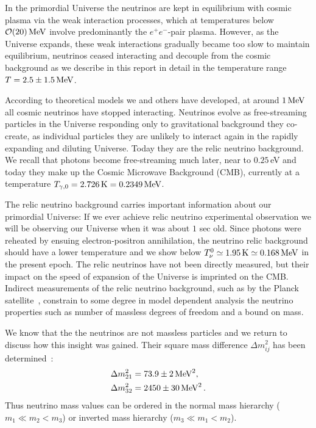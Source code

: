 In the primordial Universe the neutrinos are kept in equilibrium with cosmic plasma via the weak interaction processes, which at temperatures below $\mathcal{O}(20)\text{\,MeV}$ involve predominantly the $e^+e^-$-pair plasma. However, as the Universe expands, these weak interactions gradually became too slow to maintain equilibrium, neutrinos ceased interacting and decouple from the cosmic background as we describe in this report in detail in the temperature range $T=2.5\pm1.5\text{\,MeV}$.

According to theoretical models we and others have developed, at around $1\text{\,MeV}$ all cosmic neutrinos have stopped interacting. Neutrinos evolve as free-streaming particles in the Universe responding only to gravitational background they co-create, as individual particles they are unlikely to interact again in the rapidly expanding and diluting Universe. Today they are the relic neutrino background. We recall that photons become free-streaming much later, near to $0.25$\,eV and today they make up the Cosmic Microwave Background (CMB), currently at a temperature $T_{\gamma,0} =2.726\,\mathrm{K}=0.2349\text{\,MeV}$.

The relic neutrino background carries important information about our primordial Universe: If we ever achieve relic neutrino experimental observation we will be observing our Universe when it was about $1$ sec old. Since photons were reheated by ensuing electron-positron annihilation, the neutrino relic background should have a lower temperature and we show below $T_\nu^0\simeq 1.95\,\mathrm{K}\simeq 0.168\text{\,MeV}$ in the present epoch.
The relic neutrinos have not been directly measured, but their impact on the speed of expansion of the Universe is imprinted on the CMB. Indirect measurements of the relic neutrino background, such as by the Planck satellite~\cite{Planck:2018vyg,Planck:2015fie,Planck:2013pxb}, constrain to some degree in model dependent analysis the neutrino properties such as number of massless degrees of freedom and a bound on mass.

We know that the the neutrinos are not massless particles and we return to discuss how this insight was gained. Their square mass difference $\Delta m^2_{ij}$ has been determined~\cite{ParticleDataGroup:2022pth}:
\begin{align}
&\Delta{m}_{21}^2=73.9\pm 2\text{\,MeV} ^2,\\
&\Delta{m}_{32}^2=2450\pm 30\text{\,MeV} ^2\,.
\end{align}
Thus neutrino mass values can be ordered in the normal mass hierarchy ($m_1\ll m_2<m_3$) or inverted mass hierarchy ($m_3\ll m_1<m_2$). 

